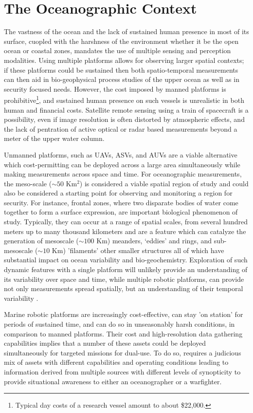 \section{The Oceanographic Context}
\label{sec:context}

The vastness of the ocean and the lack of sustained human presence in
most of its surface, cuopled with the harshness of the environment
whether it be the open ocean or coastal zones, mandates the use of
multiple sensing and perception modalities. Using multiple platforms
allows for observing larger spatial contexts; if these platforms could
be sustained then both spatio-temporal measurements can then aid in
bio-geophysical process studies of the upper ocean as well as in
security focused needs. However, the cost imposed by manned platforms
is prohibitive\footnote{Typical day costs of a research vessel amount
  to about \$22,000.}, and sustained human presence on such vessels is
unrealistic in both human and financial costs. Satellite remote
sensing using a train of spacecraft is a possibility, even if image
resolution is often distorted by atmospheric effects, and the lack of
pentration of active optical or radar based measurements beyond a
meter of the upper water column. 

Unmanned platforms, such as UAVs, ASVs, and AUVs are a viable
alternative which cost-permitting can be deployed across a large area
simultaneously while making measurements across space and time. For
oceanographic measurements, the meso-scale ($\sim 50$ Km$^2$) is
considered a viable spatial region of study and could also be
considered a starting point for observing and monitoring a region for
security. For instance, frontal zones, where two disparate bodies of
water come together to form a surface expression, are important
biological phenomenon of study. Typically, they can occur at a range
of spatial scales, from several hundred meters up to many thousand
kilometers \cite{belkin2007fronts} and are a feature which can
catalyze the generation of mesoscale ($\sim 100$ Km) meanders,
‘eddies’ and rings, and sub-mesoscale ($\sim 10$ Km) 'filaments' other
smaller structures all of which have substantial impact on ocean
variability and bio-geochemistry. Exploration of such dynamic features
with a single platform will unlikely provide an understanding of its
variability over space and time, while multiple robotic platforms, can
provide not only measurements spread spatially, but an understanding
of their temporal variability \cite{pinto20,pinto22}.

Marine robotic platforms are increasingly cost-effective, can stay 'on
station' for periods of sustained time, and can do so in unseasonably
harsh conditions, in comparison to manned platforms. Their cost and
high-resolution data gathering capabilities implies that a number of
these assets could be deployed simultaneously for targeted missions
for dual-use. To do so, requires a judicious mix of assets with
different capabilities and operating conditions leading to information
derived from multiple sources with different levels of synopticity to
provide situational awareness to either an oceanographer or a
warfighter.
